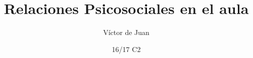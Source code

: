 \documentclass[palatino]{apuntesURJC}
\title{Relaciones Psicosociales en el aula}
\author{Víctor de Juan}
\date{16/17 C2}
\begin{document}
\pagestyle{plain}
\maketitle

\tableofcontents
\newpage



  
\label{bibliografia}

\printindex
\end{document}
